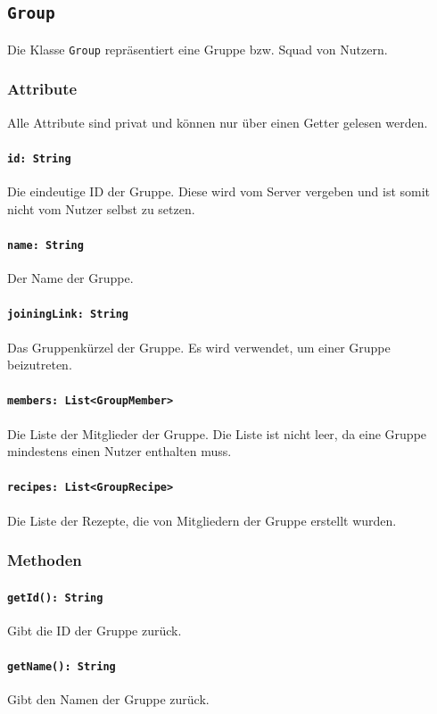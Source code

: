 \documentclass{entwurfsheft}
\begin{document}
\subsection{\texttt{Group}}\label{sec:group}
Die Klasse \texttt{Group} repräsentiert eine Gruppe bzw. Squad von Nutzern.
\subsubsection*{Attribute}
Alle Attribute sind privat und können nur über einen Getter gelesen werden.
\paragraph{\texttt{id: String}}
Die eindeutige ID der Gruppe. Diese wird vom Server vergeben und ist somit nicht vom Nutzer selbst zu setzen.
\paragraph{\texttt{name: String}}
Der Name der Gruppe.
\paragraph{\texttt{joiningLink: String}}
Das Gruppenkürzel der Gruppe. Es wird verwendet, um einer Gruppe beizutreten.
\paragraph{\texttt{members: List<GroupMember>}}
Die Liste der Mitglieder der Gruppe. Die Liste ist nicht leer, da eine Gruppe mindestens einen Nutzer enthalten muss.
\paragraph{\texttt{recipes: List<GroupRecipe>}}
Die Liste der Rezepte, die von Mitgliedern der Gruppe erstellt wurden.

\subsubsection*{Methoden}
\paragraph{\texttt{getId(): String}}
Gibt die ID der Gruppe zurück.
\paragraph{\texttt{getName(): String}}
Gibt den Namen der Gruppe zurück.
\end{document}
